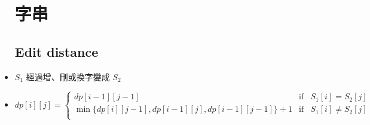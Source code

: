 \begin{itemize}

\section{字串}
    \subsection{Edit distance}
        \item $S_1$ 經過增、刪或換字變成 $S_2$
        \item $dp[i][j] = \left \{
            \begin{array}{lrc}
                dp[i-1][j-1] & \mbox{if} & S_1[i] = S_2[j] \\
                \min\{ dp[i][j-1], dp[i-1][j], dp[i-1][j-1]\}+1 & \mbox{if} & S_1[i] \neq S_2[j] \\
            \end{array}\right .$
    
\end{itemize}